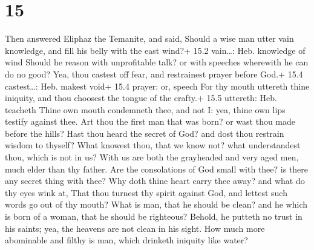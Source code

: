 \hypertarget{section-14}{%
\section{15}\label{section-14}}

 Then answered Eliphaz the Temanite, and said, 
Should a wise man utter vain knowledge, and fill his belly with the east
wind?+ 15.2 vain\ldots: Heb. knowledge of wind  Should he
reason with unprofitable talk? or with speeches wherewith he can do no
good?  Yea, thou castest off fear, and restrainest prayer
before God.+ 15.4 castest\ldots: Heb. makest void+ 15.4 prayer: or,
speech  For thy mouth uttereth thine iniquity, and thou
choosest the tongue of the crafty.+ 15.5 uttereth: Heb. teacheth
 Thine own mouth condemneth thee, and not I: yea, thine own
lips testify against thee.  Art thou the first man that was
born? or wast thou made before the hills?  Hast thou heard
the secret of God? and dost thou restrain wisdom to thyself?
 What knowest thou, that we know not? what understandest
thou, which is not in us?  With us are both the grayheaded
and very aged men, much elder than thy father.  Are the
consolations of God small with thee? is there any secret thing with
thee?  Why doth thine heart carry thee away? and what do
thy eyes wink at,  That thou turnest thy spirit against
God, and lettest such words go out of thy mouth?  What is
man, that he should be clean? and he which is born of a woman, that he
should be righteous?  Behold, he putteth no trust in his
saints; yea, the heavens are not clean in his sight.  How
much more abominable and filthy is man, which drinketh iniquity like
water?

